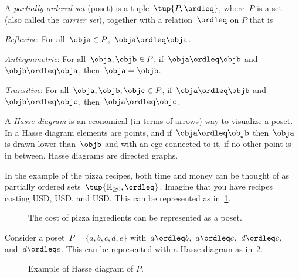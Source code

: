 

\begin{definition}
  \label{def:poset}
  A \emph{partially-ordered set} (poset) is a tuple~$\tup{P, \ordleq}$,
  where~$P$ is a set (also called the \emph{carrier set}), together with a
  relation~$\ordleq$ on $P$ that is
  \begin{compactenum}
    \item \emph{Reflexive}: For all~$\obja\in P$,~$\obja \ordleq \obja$.
    \item \emph{Antisymmetric}: For all~$\obja,\objb\in P$, if~$\obja\ordleq \objb$ and~$\objb\ordleq \obja$, then~$\obja=\objb$.
    \item \emph{Transitive}: For all~$\obja,\objb,\objc\in P$, if~$\obja\ordleq \objb$ and~$\objb\ordleq \objc$, then~$\obja\ordleq \objc$.
  \end{compactenum}
\end{definition}

A \emph{Hasse diagram} is an economical (in terms of arrows) way to visualize a poset. In a Hasse diagram elements are points, and if~$\obja \ordleq \objb$ then~$\obja$ is drawn lower than~$\objb$ and with an ege connected to it, if no other point is in between. Hasse diagrams are directed graphs.

In the example of the pizza recipes, both time and money can be thought of as partially ordered sets~$\tup{\mathbb{R}_{\geq 0},\ordleq}$. Imagine that you have recipes costing \unit[1]{USD}, \unit[2]{USD}, and \unit[3]{USD}. This can be represented as in~\cref{fig:hassepizza}.

\begin{figure}[h!]
  \begin{center}
    \caption{The cost of pizza ingredients can be represented as a poset.\label{fig:hassepizza}}
  \end{center}
\end{figure}


\begin{example}
  Consider a poset~$P=\{a,b,c,d,e\}$ with~$a\ordleq b$,~$a\ordleq c$,~$d\ordleq c$, and~$d\ordleq e$. This can be represented with a Hasse diagram as in~\cref{fig:hasse}.
\end{example}

\begin{figure}[h!]
  \centering
  \caption{Example of Hasse diagram of $P$. \label{fig:hasse}}
\end{figure}

